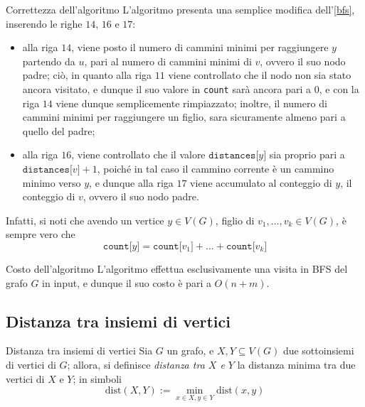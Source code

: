 \documentclass[a4paper, 12pt]{report}
\begin{document}
    \begin{framedobs}{Correttezza dell'algoritmo}
        L'algoritmo presenta una semplice modifica dell'\cref{bfs}, inserendo le righe $14$, $16$ e $17$:

        \begin{itemize}
            \item alla riga $14$, viene posto il numero di cammini minimi per raggiungere $y$ partendo da $u$, pari al numero di cammini minimi di $v$, ovvero il suo nodo padre; ciò, in quanto alla riga $11$ viene controllato che il nodo non sia stato ancora visitato, e dunque il suo valore in \texttt{count} sarà ancora pari a $0$, e con la riga $14$ viene dunque semplicemente rimpiazzato; inoltre, il numero di cammini minimi per raggiungere un figlio, sara sicuramente almeno pari a quello del padre;
            \item alla riga $16$, viene controllato che il valore $\texttt{distances[}y\texttt{]}$ sia proprio pari a $\texttt{distances[}v\texttt{]} + 1$, poiché in tal caso il cammino corrente è un cammino minimo verso $y$, e dunque alla riga $17$ viene accumulato al conteggio di $y$, il conteggio di $v$, ovvero il suo nodo padre.
        \end{itemize}

        Infatti, si noti che avendo un vertice $y \in V(G)$, figlio di $v_1, \ldots, v_k \in V(G)$, è sempre vero che $$\texttt{count[}y\texttt{]} = \texttt{count[}v_1\texttt{]} + \ldots + \texttt{count[}v_k\texttt{]}$$
    \end{framedobs}

    \begin{framedobs}{Costo dell'algoritmo}
        L'algoritmo effettua esclusivamente una visita in BFS del grafo $G$ in input, e dunque il suo costo è pari a $O(n+m)$.
    \end{framedobs}

    \subsection{Distanza tra insiemi di vertici}

    \begin{frameddefn}{Distanza tra insiemi di vertici}
        Sia $G$ un grafo, e $X, Y \subseteq V(G)$ due sottoinsiemi di vertici di $G$; allora, si definisce \textit{distanza tra $X$ e $Y$} la distanza minima tra due vertici di $X$ e $Y$; in simboli $$\mathrm{dist}(X, Y) := \min_{x \in X, y \in Y}{\mathrm{dist}(x, y)}$$
    \end{frameddefn}
\end{document}
